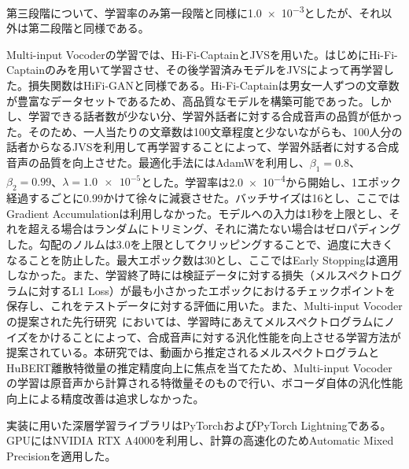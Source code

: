 \documentclass[12pt]{jarticle}
\numberwithin{equation}{section}    %
\numberwithin{figure}{section}      %
\numberwithin{table}{section}      %
\begin{document}
第三段階について、学習率のみ第一段階と同様に\num{1.0e-3}としたが、それ以外は第二段階と同様である。

Multi-input Vocoderの学習では、Hi-Fi-CaptainとJVSを用いた。はじめにHi-Fi-Captainのみを用いて学習させ、その後学習済みモデルをJVSによって再学習した。損失関数はHiFi-GANと同様である。Hi-Fi-Captainは男女一人ずつの文章数が豊富なデータセットであるため、高品質なモデルを構築可能であった。しかし、学習できる話者数が少ない分、学習外話者に対する合成音声の品質が低かった。そのため、一人当たりの文章数は100文章程度と少ないながらも、100人分の話者からなるJVSを利用して再学習することによって、学習外話者に対する合成音声の品質を向上させた。最適化手法にはAdamWを利用し、$\beta_{1} = 0.8$、$\beta_{2} = 0.99$、$\lambda = \num{1.0e-5}$とした。学習率は\num{2.0e-4}から開始し、1エポック経過するごとに0.99かけて徐々に減衰させた。バッチサイズは16とし、ここではGradient Accumulationは利用しなかった。モデルへの入力は1秒を上限とし、それを超える場合はランダムにトリミング、それに満たない場合はゼロパディングした。勾配のノルムは3.0を上限としてクリッピングすることで、過度に大きくなることを防止した。最大エポック数は30とし、ここではEarly Stoppingは適用しなかった。また、学習終了時には検証データに対する損失（メルスペクトログラムに対するL1 Loss）が最も小さかったエポックにおけるチェックポイントを保存し、これをテストデータに対する評価に用いた。また、Multi-input Vocoderの提案された先行研究~\cite{choi2023intelligible}においては、学習時にあえてメルスペクトログラムにノイズをかけることによって、合成音声に対する汎化性能を向上させる学習方法が提案されている。本研究では、動画から推定されるメルスペクトログラムとHuBERT離散特徴量の推定精度向上に焦点を当てたため、Multi-input Vocoderの学習は原音声から計算される特徴量そのもので行い、ボコーダ自体の汎化性能向上による精度改善は追求しなかった。

実装に用いた深層学習ライブラリはPyTorchおよびPyTorch Lightningである。GPUにはNVIDIA RTX A4000を利用し、計算の高速化のためAutomatic Mixed Precisionを適用した。
\end{document}
